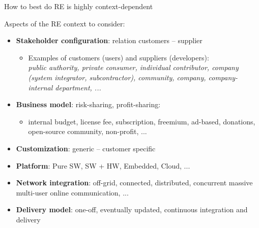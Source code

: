 

\begin{Slide}{How to best do RE is highly context-dependent}

Aspects of the RE context to consider: 
\begin{itemize}
\item \textbf{Stakeholder configuration}: relation customers -- supplier  
\begin{itemize}
\item Examples of customers (users) and suppliers (developers): \\
    \textit{public authority, private consumer, individual contributor, company (system integrator, subcontractor), community, company, company-internal department, ...}
\end{itemize}
\item \textbf{Business model}: risk-sharing, profit-sharing: \\
\begin{itemize}
\item internal budget, license fee, subscription, freemium, ad-based, donations, open-source community, non-profit, ... 
\end{itemize}
\item \textbf{Customization}: generic -- customer specific
\item \textbf{Platform}: Pure SW, SW + HW, Embedded, Cloud, ...
\item \textbf{Network integration}: off-grid, connected, distributed, concurrent massive multi-user online communication, ...
\item \textbf{Delivery model}: one-off, eventually updated, continuous integration and delivery

\end{itemize}
\end{Slide}